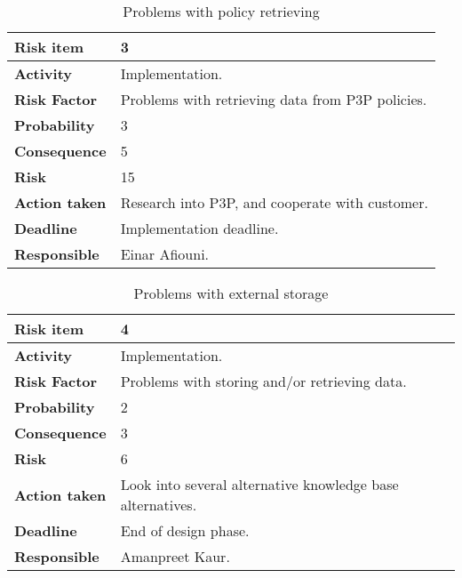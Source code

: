 \begin{table}[htdp]
\caption{Problems with policy retrieving}
\begin{center}
\begin{tabularx}{\textwidth}{| X | X |}
\hline
\textbf{Risk item} & 3 \\
\hline
\textbf{Activity} & Implementation.  \\
\hline
\textbf{Risk Factor} & Problems with retrieving data from P3P policies. \\
\hline
\textbf{Probability} & 3 \\
\hline
\textbf{Consequence} & 5 \\
\hline
\textbf{Risk} & 15 \\
\hline
\textbf{Action taken} & Research into P3P, and cooperate with \newline customer. \\
\hline
\textbf{Deadline} & Implementation deadline. \\
\hline
\textbf{Responsible} & Einar Afiouni. \\
\hline
\end{tabularx}
\end{center}
\label{risk_3}
\end{table}

\begin{table}[htdp]
\caption{Problems with external storage}
\begin{center}
\begin{tabularx}{\textwidth}{| X | X |}
\hline
\textbf{Risk item} & 4 \\
\hline
\textbf{Activity} & Implementation. \\
\hline
\textbf{Risk Factor} & Problems with storing and/or retrieving data. \\
\hline
\textbf{Probability} & 2 \\
\hline
\textbf{Consequence} & 3 \\
\hline
\textbf{Risk} & 6 \\
\hline
\textbf{Action taken} & Look into several alternative knowledge base alternatives.  \\
\hline
\textbf{Deadline} & End of design phase. \\
\hline
\textbf{Responsible} & Amanpreet Kaur. \\
\hline
\end{tabularx}
\end{center}
\label{risk_4}
\end{table}

